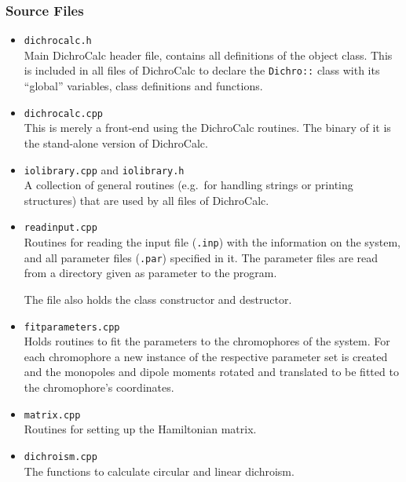 \documentclass[11pt, letterpaper]{article}
\begin{document}
\newpage


\subsubsection{Source Files}

\begin{itemize}

\item \verb'dichrocalc.h' \\
Main DichroCalc header file, contains all definitions of the object class. This is included in all files of DichroCalc to declare the \verb'Dichro::' class with its ``global'' variables, class definitions and functions.
\vspace{1em}

\item \verb'dichrocalc.cpp' \\
This is merely a front-end using the DichroCalc routines. The binary of it is the stand-alone version of DichroCalc.

\item \verb'iolibrary.cpp' and \verb'iolibrary.h' \\
A collection of general routines (e.g.\ for handling strings or printing structures) that are used by all files of DichroCalc.

\item \verb'readinput.cpp' \\
Routines for reading the input file (\verb'.inp') with the information on the system, and all parameter files (\verb'.par') specified in it. The parameter files are read from a directory given as parameter to the program.

The file also holds the class constructor and destructor.

\item \verb'fitparameters.cpp' \\
Holds routines to fit the parameters to the chromophores of the system. For each chromophore a new instance of the respective parameter set is created and the monopoles and dipole moments rotated and translated to be fitted to the chromophore's coordinates.

\item \verb'matrix.cpp' \\
Routines for setting up the Hamiltonian matrix.

\item \verb'dichroism.cpp' \\
The functions to calculate circular and linear dichroism.

\end{itemize}
\end{document}
